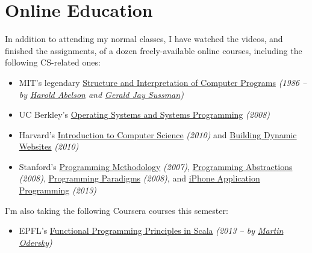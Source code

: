 \documentclass{tccv}
\begin{document}
{{\vspace{10pt}










\section{Online Education}

In addition to attending my normal classes, I have watched the videos, and finished the assignments, of a dozen freely-available online courses, including the following CS-related ones:

\begin{itemize}

\item MIT's legendary \href{http://groups.csail.mit.edu/mac/classes/6.001/abelson-sussman-lectures/}{Structure and Interpretation of Computer Programs} {\it(1986 -- by \href{https://en.wikipedia.org/wiki/Hal_Abelson}{Harold Abelson} and \href{https://en.wikipedia.org/wiki/Gerald_Jay_Sussman}{Gerald Jay Sussman})}

\item UC Berkley's \href{http://www.cs.berkeley.edu/~kubitron/courses/cs162-F08/}{Operating Systems and Systems Programming} {\it(2008)}

\item Harvard's \href{http://cs50.tv/2010/fall/}{Introduction to Computer Science} {\it(2010)} and \href{http://cs75.tv/2010/fall/}{Building Dynamic Websites} {\it(2010)}

\item Stanford's \href{http://see.stanford.edu/see/courseinfo.aspx?coll=824a47e1-135f-4508-a5aa-866adcae1111}{Programming Methodology} {\it(2007)}, \href{http://see.stanford.edu/see/courseinfo.aspx?coll=11f4f422-5670-4b4c-889c-008262e09e4e}{Programming Abstractions} {\it(2008)}, \href{http://see.stanford.edu/see/courseinfo.aspx?coll=2d712634-2bf1-4b55-9a3a-ca9d470755ee}{Programming Paradigms} {\it(2008)}, and \href{http://www.stanford.edu/class/cs193p}{iPhone Application Programming} {\it(2013)}
	
\end{itemize}

I'm also taking the following Coursera courses this semester: 

\begin{itemize}

\item EPFL's \href{https://www.coursera.org/course/progfun}{Functional Programming Principles in Scala} {\it(2013 -- by \href{https://en.wikipedia.org/wiki/Martin_Odersky}{Martin Odersky})}


\end{itemize}}}
\end{document}
